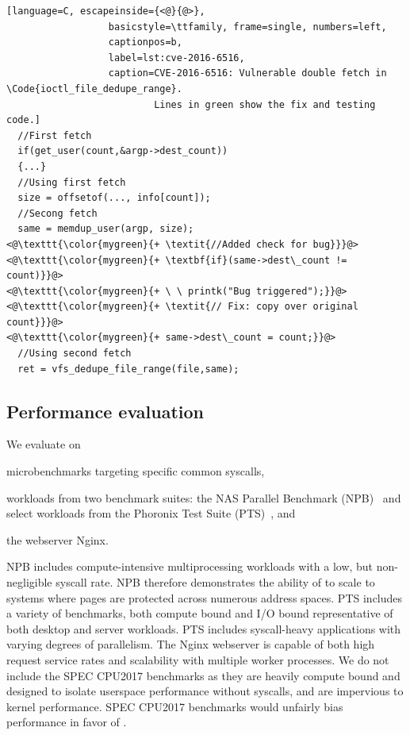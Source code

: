 \documentclass[letterpaper,twocolumn,10pt]{article}
\begin{document}
\begin{minipage}{\linewidth}
\begin{lstlisting}[language=C, escapeinside={<@}{@>}, 
                  basicstyle=\ttfamily, frame=single, numbers=left, 
                  captionpos=b,
                  label=lst:cve-2016-6516,
                  caption=CVE-2016-6516: Vulnerable double fetch in \Code{ioctl_file_dedupe_range}. 
                          Lines in green show the fix and testing code.]
  //First fetch
  if(get_user(count,&argp->dest_count)) 
  {...}
  //Using first fetch
  size = offsetof(..., info[count]);
  //Secong fetch
  same = memdup_user(argp, size);
<@\texttt{\color{mygreen}{+ \textit{//Added check for bug}}}@>
<@\texttt{\color{mygreen}{+ \textbf{if}(same->dest\_count != count)}}@>
<@\texttt{\color{mygreen}{+ \ \ printk("Bug triggered");}}@>
<@\texttt{\color{mygreen}{+ \textit{// Fix: copy over original count}}}@>
<@\texttt{\color{mygreen}{+ same->dest\_count = count;}}@>
  //Using second fetch
  ret = vfs_dedupe_file_range(file,same);
\end{lstlisting}
\end{minipage}


\subsection{Performance evaluation}
\label{sec:perf}

We evaluate \midas on
\begin{inparaenum}
\item microbenchmarks targeting specific common syscalls,
\item workloads from two benchmark suites: the NAS Parallel 
    Benchmark (NPB)~\cite{npb} and select workloads 
    from the Phoronix Test Suite (PTS)~\cite{pts}, and
\item the webserver Nginx.
\end{inparaenum}
NPB includes compute-intensive multiprocessing workloads with a 
low, but non-negligible syscall rate. 
NPB therefore demonstrates the ability of \midas to 
scale to systems where pages are protected across numerous 
address spaces.
PTS includes a variety of benchmarks, both compute bound and 
I/O bound representative of both desktop and server workloads.
PTS includes syscall-heavy applications with varying degrees 
of parallelism.
The Nginx webserver is capable of both high request service rates
and scalability with multiple worker processes.
We do not include the SPEC CPU2017 benchmarks
as they are heavily compute bound and designed to isolate userspace 
performance without syscalls, and are impervious to kernel performance.
SPEC CPU2017 benchmarks would unfairly bias performance in favor of
\midas.
\end{document}
